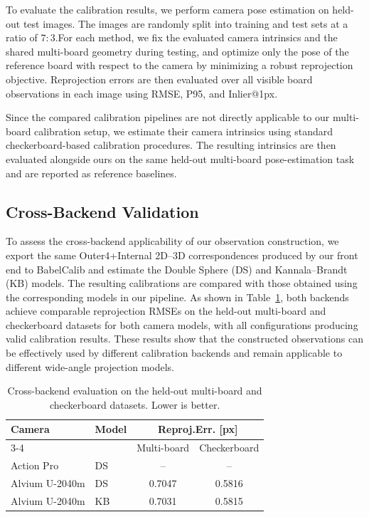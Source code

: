 \documentclass[letterpaper, 10 pt, conference]{ieeeconf}  %
\begin{document}
To evaluate the calibration results, we perform camera pose estimation
on held-out test images. The images are randomly split into training
and test sets at a ratio of $7{:}3$.For each method, we fix the evaluated camera intrinsics
and the shared multi-board geometry during testing, and optimize only
the pose of the reference board with respect to the camera by minimizing
a robust reprojection objective. Reprojection errors are then evaluated
over all visible board observations in each image using RMSE, P95, and
Inlier@1px.

Since the compared calibration pipelines are not directly applicable
to our multi-board calibration setup, we estimate their camera
intrinsics using standard checkerboard-based calibration procedures.
The resulting intrinsics are then evaluated alongside ours on the same
held-out multi-board pose-estimation task and are reported as reference
baselines.

\subsection{Cross-Backend Validation}

To assess the cross-backend applicability of our observation
construction, we export the same Outer4+Internal 2D--3D
correspondences produced by our front end to BabelCalib and estimate
the Double Sphere (DS) and Kannala--Brandt (KB) models. The resulting
calibrations are compared with those obtained using the corresponding
models in our pipeline. As shown in Table~\ref{tab:cross_backend}, both
backends achieve comparable reprojection RMSEs on the held-out
multi-board and checkerboard datasets for both camera models, with all
configurations producing valid calibration results. These results show
that the constructed observations can be effectively used by different
calibration backends and remain applicable to different wide-angle
projection models.

\begin{table}[t]
  \centering
  \caption{Cross-backend evaluation on the held-out multi-board and
  checkerboard datasets. Lower is better.}
  \label{tab:cross_backend}
  \small
  \setlength{\tabcolsep}{3.5pt}
  \renewcommand{\arraystretch}{1.08}
  \begin{tabular}{@{}llcc@{}}
    \toprule
    \multirow{2}{*}{Camera}
    & \multirow{2}{*}{Model}
    & \multicolumn{2}{c}{Reproj.Err. [px] } \\
    \cmidrule(lr){3-4}
    & & Multi-board & Checkerboard \\
    \midrule
    Action Pro & DS & -- & -- \\
    Alvium U-2040m & DS & 0.7047 & 0.5816 \\
    Alvium U-2040m & KB & 0.7031 & 0.5815 \\
    \bottomrule
  \end{tabular}
\end{table}
\end{document}
